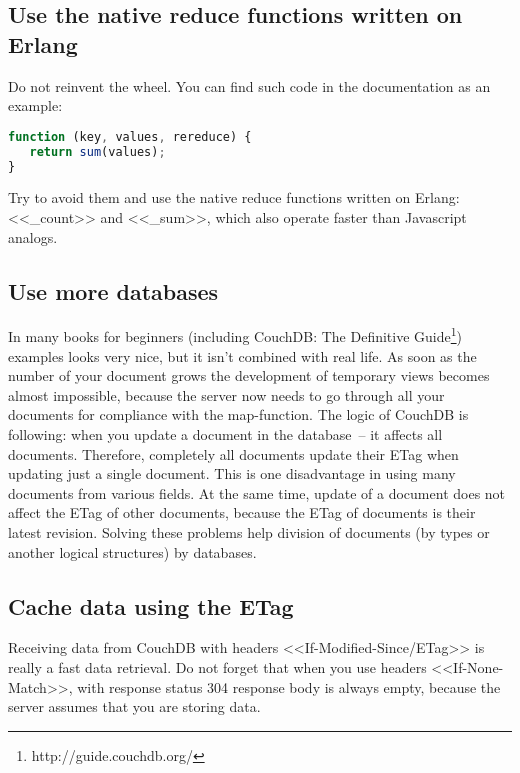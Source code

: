 \subsection{Use the native reduce functions written on Erlang}

Do not reinvent the wheel. You can find such code in the documentation as an example:

\begin{lstlisting}[language=Javascript,label=lst:couchdb2,caption=Use the native reduce functions written on Erlang]
function (key, values, rereduce) {
   return sum(values);
}
\end{lstlisting}

Try to avoid them and use the native reduce functions written on Erlang: <<\_count>> and <<\_sum>>, which also operate faster than Javascript analogs.

\subsection{Use more databases}

In many books for beginners (including CouchDB: The Definitive Guide\footnote{http://guide.couchdb.org/}) examples looks very nice, but it isn’t combined with real life. As soon as the number of your document grows the development of temporary views becomes almost impossible, because the server now needs to go through all your documents for compliance with the map-function. The logic of CouchDB is following: when you update a document in the database~-- it affects all documents. Therefore, completely all documents update their ETag when updating just a single document. This is one disadvantage in using many documents from various fields. At the same time, update of a document does not affect the ETag of other documents, because the ETag of documents is their latest revision. Solving these problems help division of documents (by types or another logical structures) by databases.

\subsection{Cache data using the ETag}

Receiving data from CouchDB with headers <<If-Modified-Since/ETag>> is really a fast data retrieval. Do not forget that when you use headers <<If-None-Match>>, with response status 304 response body is always empty, because the server assumes that you are storing data.

